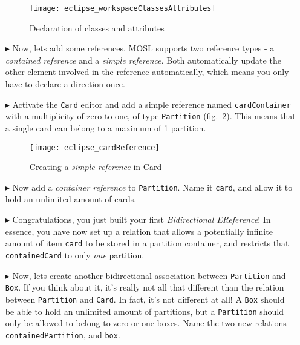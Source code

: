 \begin{itemize}
\begin{figure}[htbp]
	\centering
  \texttt{[image: eclipse\_workspaceClassesAttributes]}
	\caption{Declaration of classes and attributes}
	\label{fig:workspaceClassAttributes}
\end{figure} 

\item[$\blacktriangleright$] Now, lets add some references. MOSL supports two reference types - a \emph{contained reference} and a \emph{simple reference}. Both automatically update the other element involved in the reference automatically, which means you only have to declare a direction once.

\item[$\blacktriangleright$] Activate the \texttt{Card} editor and add a simple reference named \texttt{cardContainer} with a multiplicity of zero to one, of type \texttt{Partition} (fig.~\ref{fig:cardReference}). This means that a single card can belong to a maximum of 1 partition.

\begin{figure}[htbp]
	\centering
  \texttt{[image: eclipse\_cardReference]}
	\caption{Creating a \emph{simple reference} in Card}
	\label{fig:cardReference}
\end{figure} 

\item[$\blacktriangleright$] Now add a \emph{container reference} to \texttt{Partition}. Name it \texttt{card}, and allow it to hold an unlimited amount of cards.

\item[$\blacktriangleright$] Congratulations, you just built your first \emph{Bidirectional EReference}! In essence, you have now set up a relation that allows a potentially infinite amount of item \texttt{card} to be stored in a partition container, and restricts that \texttt{containedCard} to only \emph{one} partition.

\item[$\blacktriangleright$] Now, lets create another bidirectional association between \texttt{Partition} and \texttt{Box}. If you think about it, it's really not all that different than the relation between \texttt{Partition} and \texttt{Card}. In fact, it's not different at all! A \texttt{Box} should be able to hold an unlimited amount of partitions, but a \texttt{Partition} should only be allowed to belong to zero or one boxes. Name the two new relations \texttt{containedPartition}, and \texttt{box}. 


\end{itemize}
